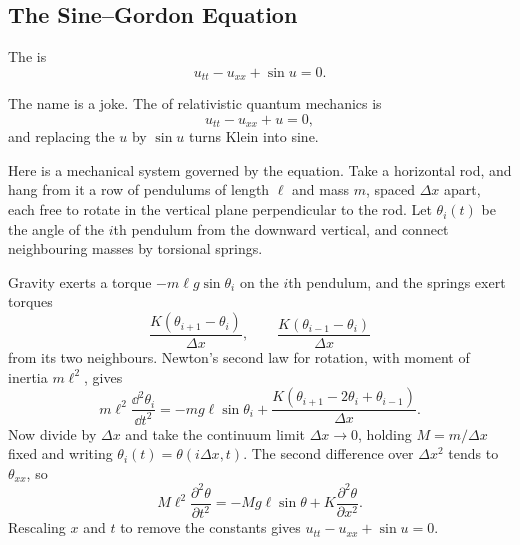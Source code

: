\documentclass[a4paper]{scrartcl}
\begin{document}
\subsection{The Sine--Gordon Equation}

\begin{definition}
	The  is
	$$
	u_{tt} - u_{xx} + \sin u = 0.
	$$
\end{definition}

The name is a joke. The  of relativistic quantum mechanics is
$$
u_{tt} - u_{xx} + u = 0,
$$
and replacing the $u$ by $\sin u$ turns Klein into sine.

\begin{example}
	Here is a mechanical system governed by the equation. Take a horizontal rod, and hang from it a row of pendulums of length $\ell$ and mass $m$, spaced $\Delta x$ apart, each free to rotate in the vertical plane perpendicular to the rod. Let $\theta_i(t)$ be the angle of the $i$th pendulum from the downward vertical, and connect neighbouring masses by torsional springs.
	\begin{center}
	\end{center}
	Gravity exerts a torque $-m\ell g\sin\theta_i$ on the $i$th pendulum, and the springs exert torques
	$$
	\frac{K(\theta_{i+1}-\theta_i)}{\Delta x}, \qquad \frac{K(\theta_{i-1}-\theta_i)}{\Delta x}
	$$
	from its two neighbours. Newton's second law for rotation, with moment of inertia $m\ell^2$, gives
	$$
	m\ell^2\frac{\dd^2\theta_i}{\dd t^2} = -mg\ell\sin\theta_i + \frac{K\left(\theta_{i+1} - 2\theta_i + \theta_{i-1}\right)}{\Delta x}.
	$$
	Now divide by $\Delta x$ and take the continuum limit $\Delta x\to0$, holding $M = m/\Delta x$ fixed and writing $\theta_i(t) = \theta(i\Delta x, t)$. The second difference over $\Delta x^2$ tends to $\theta_{xx}$, so
	$$
	M\ell^2\frac{\partial^2\theta}{\partial t^2} = -Mg\ell\sin\theta + K\frac{\partial^2\theta}{\partial x^2}.
	$$
	Rescaling $x$ and $t$ to remove the constants gives $u_{tt} - u_{xx} + \sin u = 0$.
\end{example}
\end{document}
